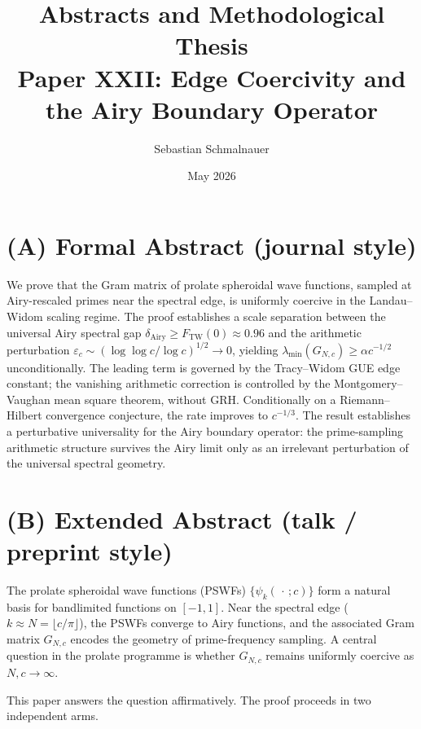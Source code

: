 \documentclass[12pt,a4paper]{amsart}
\title{Abstracts and Methodological Thesis\\
{\small Paper XXII: Edge Coercivity and the Airy Boundary Operator}}
\author{Sebastian Schmalnauer}
\date{May 2026}
\begin{document}
\maketitle

\section*{(A) Formal Abstract (journal style)}

We prove that the Gram matrix of prolate spheroidal wave functions,
sampled at Airy-rescaled primes near the spectral edge, is
uniformly coercive in the Landau--Widom scaling regime.
The proof establishes a scale separation between the universal
Airy spectral gap $\delta_{\mathrm{Airy}} \ge F_{\mathrm{TW}}(0) \approx 0.96$
and the arithmetic perturbation
$\varepsilon_c \sim (\log\log c/\log c)^{1/2} \to 0$,
yielding $\lambda_{\min}(G_{N,c}) \ge \alpha c^{-1/2}$ unconditionally.
The leading term is governed by the Tracy--Widom GUE edge constant;
the vanishing arithmetic correction is controlled by the
Montgomery--Vaughan mean square theorem, without GRH.
Conditionally on a Riemann--Hilbert convergence conjecture,
the rate improves to $c^{-1/3}$.
The result establishes a perturbative universality for the Airy
boundary operator: the prime-sampling arithmetic structure survives
the Airy limit only as an irrelevant perturbation of the universal
spectral geometry.

\section*{(B) Extended Abstract (talk / preprint style)}

The prolate spheroidal wave functions (PSWFs) $\{\psi_k(\,\cdot\,;c)\}$
form a natural basis for bandlimited functions on $[-1,1]$.
Near the spectral edge ($k \approx N = \lfloor c/\pi\rfloor$),
the PSWFs converge to Airy functions, and the associated Gram matrix
$G_{N,c}$ encodes the geometry of prime-frequency sampling.
A central question in the prolate programme is whether $G_{N,c}$
remains uniformly coercive as $N, c \to \infty$.

This paper answers the question affirmatively.
The proof proceeds in two independent arms.
\end{document}

